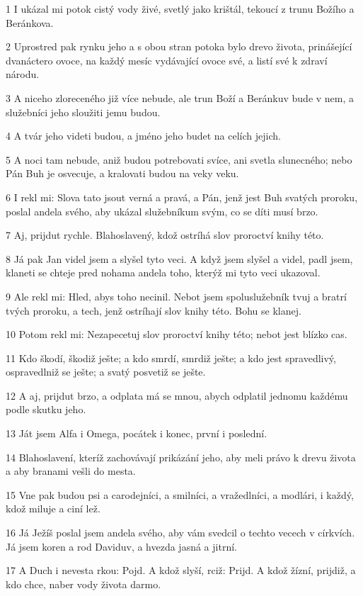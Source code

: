 \par 1 I ukázal mi potok cistý vody živé, svetlý jako krištál, tekoucí z trunu Božího a Beránkova.
\par 2 Uprostred pak rynku jeho a s obou stran potoka bylo drevo života, prinášející dvanáctero ovoce, na každý mesíc vydávající ovoce své, a listí své k zdraví národu.
\par 3 A niceho zloreceného již více nebude, ale trun Boží a Beránkuv bude v nem, a služebníci jeho sloužiti jemu budou.
\par 4 A tvár jeho videti budou, a jméno jeho budet na celích jejich.
\par 5 A noci tam nebude, aniž budou potrebovati svíce, ani svetla slunecného; nebo Pán Buh je osvecuje, a kralovati budou na veky veku.
\par 6 I rekl mi: Slova tato jsout verná a pravá, a Pán, jenž jest Buh svatých proroku, poslal andela svého, aby ukázal služebníkum svým, co se díti musí brzo.
\par 7 Aj, prijdut rychle. Blahoslavený, kdož ostríhá slov proroctví knihy této.
\par 8 Já pak Jan videl jsem a slyšel tyto veci. A když jsem slyšel a videl, padl jsem, klaneti se chteje pred nohama andela toho, kterýž mi tyto veci ukazoval.
\par 9 Ale rekl mi: Hled, abys toho necinil. Nebot jsem spoluslužebník tvuj a bratrí tvých proroku, a tech, jenž ostríhají slov knihy této. Bohu se klanej.
\par 10 Potom rekl mi: Nezapecetuj slov proroctví knihy této; nebot jest blízko cas.
\par 11 Kdo škodí, škodiž ješte; a kdo smrdí, smrdiž ješte; a kdo jest spravedlivý, ospravedlniž se ješte; a svatý posvetiž se ješte.
\par 12 A aj, prijdut brzo, a odplata má se mnou, abych odplatil jednomu každému podle skutku jeho.
\par 13 Ját jsem Alfa i Omega, pocátek i konec, první i poslední.
\par 14 Blahoslavení, kteríž zachovávají prikázání jeho, aby meli právo k drevu života a aby branami vešli do mesta.
\par 15 Vne pak budou psi a carodejníci, a smilníci, a vražedlníci, a modlári, i každý, kdož miluje a ciní lež.
\par 16 Já Ježíš poslal jsem andela svého, aby vám svedcil o techto vecech v církvích. Já jsem koren a rod Daviduv, a hvezda jasná a jitrní.
\par 17 A Duch i nevesta rkou: Pojd. A kdož slyší, rciž: Prijd. A kdož žízní, prijdiž, a kdo chce, naber vody života darmo.
